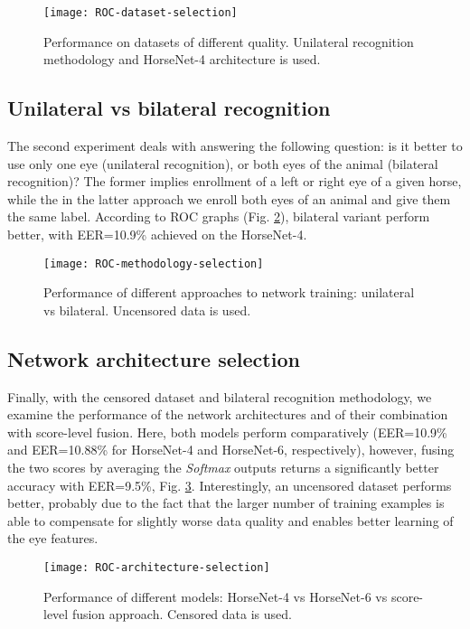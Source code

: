 \documentclass[10pt,twocolumn,letterpaper]{article}
\begin{document}
\begin{figure}[!t]
\centering
\texttt{[image: ROC-dataset-selection]}
\vskip0.2cm
\caption{Performance on datasets of different quality. Unilateral recognition methodology and HorseNet-4 architecture is used.}
\label{fig:roc-datasets}
\end{figure}


\subsection{Unilateral vs bilateral recognition}
The second experiment deals with answering the following question: is it better to use only one eye (unilateral recognition), or both eyes of the animal (bilateral recognition)? The former implies enrollment of a left or right eye of a given horse, while the in the latter approach we enroll both eyes of an animal and give them the same label. According to ROC graphs (Fig. \ref{fig:roc-methodology}), bilateral variant perform better, with EER=10.9\% achieved on the HorseNet-4. 

\begin{figure}[!t]
\centering
\texttt{[image: ROC-methodology-selection]}
\vskip0.2cm
\caption{Performance of different approaches to network training: unilateral vs bilateral. Uncensored data is used.}
\label{fig:roc-methodology}
\end{figure}

\subsection{Network architecture selection}
Finally, with the censored dataset and bilateral recognition methodology, we examine the performance of the network architectures and of their combination with score-level fusion. Here, both models perform comparatively (EER=10.9\% and EER=10.88\% for HorseNet-4 and HorseNet-6, respectively), however, fusing the two scores by averaging the \emph{Softmax} outputs returns a significantly better accuracy with EER=9.5\%, Fig. \ref{fig:roc-architectures}. Interestingly, an uncensored dataset performs better, probably due to the fact that the larger number of training examples is able to compensate for slightly worse data quality and enables better learning of the eye features. 

\begin{figure}[!t]
\centering
\texttt{[image: ROC-architecture-selection]}
\vskip0.2cm
\caption{Performance of different models: HorseNet-4 vs HorseNet-6 vs score-level fusion approach. Censored data is used.}
\label{fig:roc-architectures}
\end{figure}
\end{document}
